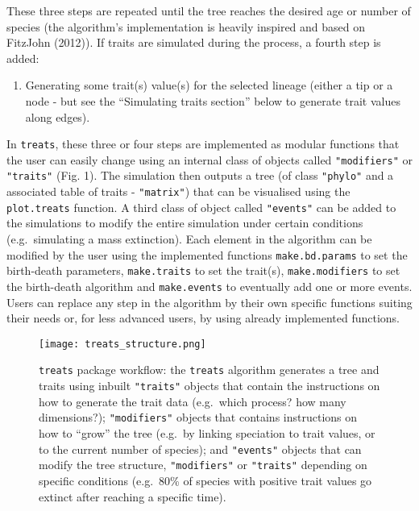 \documentclass[
]{article}
\providecommand{\tightlist}{%
  \setlength{\itemsep}{0pt}\setlength{\parskip}{0pt}}
\begin{document}
These three steps are repeated until the tree reaches the desired age or
number of species (the algorithm's implementation is heavily inspired
and based on FitzJohn (2012)). If traits are simulated during the
process, a fourth step is added:

\begin{enumerate}
\def\labelenumi{\arabic{enumi}.}
\setcounter{enumi}{3}
\tightlist
\item
  Generating some trait(s) value(s) for the selected lineage (either a
  tip or a node - but see the ``Simulating traits section'' below to
  generate trait values along edges).
\end{enumerate}

In \texttt{treats}, these three or four steps are implemented as modular
functions that the user can easily change using an internal class of
objects called \texttt{"modifiers"} or \texttt{"traits"} (Fig. 1). The
simulation then outputs a tree (of class \texttt{"phylo"} and a
associated table of traits - \texttt{"matrix"}) that can be visualised
using the \texttt{plot.treats} function. A third class of object called
\texttt{"events"} can be added to the simulations to modify the entire
simulation under certain conditions (e.g.~simulating a mass extinction).
Each element in the algorithm can be modified by the user using the
implemented functions \texttt{make.bd.params} to set the birth-death
parameters, \texttt{make.traits} to set the trait(s),
\texttt{make.modifiers} to set the birth-death algorithm and
\texttt{make.events} to eventually add one or more events. Users can
replace any step in the algorithm by their own specific functions
suiting their needs or, for less advanced users, by using already
implemented functions.

\begin{figure}
\hypertarget{figure1}{%
\centering
\texttt{[image: treats\_structure.png]}
\caption{\texttt{treats} package workflow: the \texttt{treats} algorithm
generates a tree and traits using inbuilt \texttt{"traits"} objects that
contain the instructions on how to generate the trait data (e.g.~which
process? how many dimensions?); \texttt{"modifiers"} objects that
contains instructions on how to ``grow'' the tree (e.g.~by linking
speciation to trait values, or to the current number of species); and
\texttt{"events"} objects that can modify the tree structure,
\texttt{"modifiers"} or \texttt{"traits"} depending on specific
conditions (e.g.~80\% of species with positive trait values go extinct
after reaching a specific time).}\label{figure1}
}
\end{figure}
\end{document}
